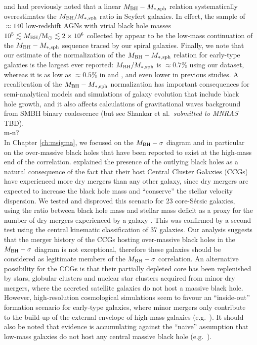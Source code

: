 \citet{wandel1999} and \citet{ryan2007} had previously noted that a linear $M_{\rm BH} - M_{\rm *,sph}$ relation 
systematically overestimates the $M_{\rm BH}/M_{\rm *,sph}$ ratio in Seyfert galaxies. 
In effect, the sample of $\approx 140$ low-redshift AGNs with virial black hole masses 
$10^5 \lesssim M_{\rm BH}/{\rm M_\odot} \lesssim 2 \times 10^6$ collected by \citet{grahamscott2015} 
appear to be the low-mass continuation of the $M_{\rm BH} - M_{\rm *,sph}$ sequence traced by our spiral galaxies. 
Finally, we note that our estimate of the normalization of the $M_{\rm BH} - M_{\rm *,sph}$ relation for early-type galaxies 
is the largest ever reported: $M_{\rm BH}/M_{\rm *,sph}$ is $\approx 0.7\%$ using our dataset, 
whereas it is as low as $\approx 0.5\%$ in \citet{scott2013} and \citet{kormendyho2013}, 
and even lower in previous studies. 
A recalibration of the $M_{\rm BH} - M_{\rm *,sph}$ normalization has important consequences 
for semi-analytical models and simulations of galaxy evolution that include black hole growth, 
and it also affects calculations of gravitational waves background from SMBH binary coalescence 
(but see Shankar et al.~\emph{submitted to MNRAS} TBD). \\

m-n? \\

In Chapter \ref{ch:msigma}, we focused on the $M_{\rm BH} - \sigma$ diagram 
and in particular on the over-massive black holes that have been reported to exist 
at the high-mass end of the correlation. 
\citet{volontericiotti2013} explained the presence of the outlying black holes 
as a natural consequence of the fact that their host Central Cluster Galaxies (CCGs) have experienced more dry mergers 
than any other galaxy, 
since dry mergers are expected to increase the black hole mass 
and ``conserve'' the stellar velocity dispersion. 
We tested and disproved this scenario for 23 core-S\'ersic galaxies, 
using the ratio between black hole mass and stellar mass deficit as a proxy 
for the number of dry mergers experienced by a galaxy \citep{merritt2006}. 
This was confirmed by a second test using the central kinematic classification of 37 galaxies. 
Our analysis suggests that 
the merger history of the CCGs hosting over-massive black holes in the $M_{\rm BH} - \sigma$ diagram 
is not exceptional, 
therefore these galaxies should be considered as legitimate members of the $M_{\rm BH} - \sigma$ correlation. 
An alternative possibility for the CCGs is that their partially depleted core 
has been replenished by stars, globular clusters and nuclear star clusters 
acquired from minor dry mergers, 
where the accreted satellite galaxies do not host a massive black hole. 
However, high-resolution cosmological simulations seem to favour an ``inside-out'' formation scenario 
for early-type galaxies, 
where minor mergers only contribute to the build-up of the external envelope of high-mass galaxies 
(e.g.~\citealt{wellons2016}). 
It should also be noted that evidence is accumulating against the ``naive'' assumption 
that low-mass galaxies do not host any central massive black hole 
(e.g.~\citealt{Baldassare2015,Graham2016LEDA}). \\

